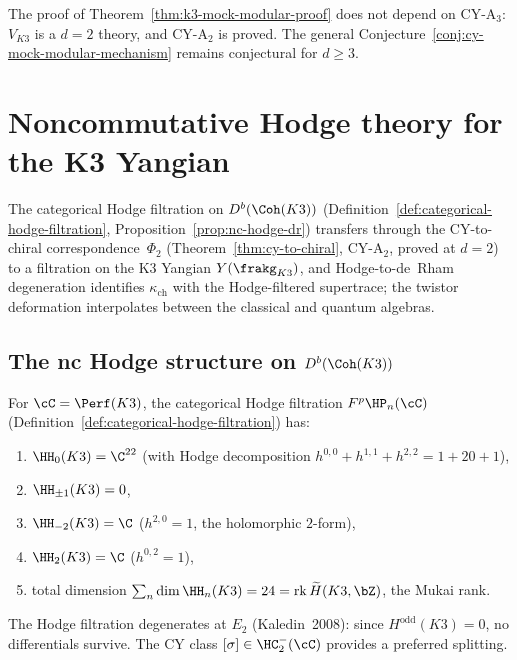 \begin{remark}
\label{rem:k3-mock-dependency}
The proof of Theorem~\ref{thm:k3-mock-modular-proof} does not depend on CY-A$_3$: $V_{K3}$ is a $d = 2$ theory, and CY-A$_2$ is proved. The general Conjecture~\ref{conj:cy-mock-modular-mechanism} remains conjectural for $d \geq 3$.

\smallskip\noindent
\end{remark}



\section{Noncommutative Hodge theory for the K3 Yangian}
\label{sec:nc-hodge-k3-yangian}

The categorical Hodge filtration on $D^b(\Coh(K3))$
(Definition~\ref{def:categorical-hodge-filtration},
Proposition~\ref{prop:nc-hodge-dr})
transfers through the CY-to-chiral correspondence~$\Phi_2$
(Theorem~\ref{thm:cy-to-chiral}, CY-A$_2$, proved at $d=2$) to a
filtration on the K3 Yangian $Y(\frakg_{K3})$, and Hodge-to-de~Rham
degeneration identifies $\kappa_{\mathrm{ch}}$ with the Hodge-filtered
supertrace; the twistor deformation interpolates between the classical
and quantum algebras.

\subsection{The nc Hodge structure on \texorpdfstring{$D^b(\Coh(K3))$}{D-b(Coh(K3))}}
\label{subsec:nc-hodge-k3-cat}

\begin{proposition}
\label{prop:nc-hodge-k3}
For $\cC = \Perf(K3)$, the categorical Hodge filtration
$F^p\HP_n(\cC)$ (Definition~\ref{def:categorical-hodge-filtration})
has:
\begin{enumerate}[label=(\roman*)]
 \item $\HH_0(K3) = \C^{22}$ \textup{(}with Hodge decomposition
 $h^{0,0} + h^{1,1} + h^{2,2} = 1 + 20 + 1$\textup{)},
 \item $\HH_{\pm 1}(K3) = 0$,
 \item $\HH_{-2}(K3) = \C$ \textup{(}$h^{2,0} = 1$, the holomorphic
 $2$-form\textup{)},
 \item $\HH_2(K3) = \C$ \textup{(}$h^{0,2} = 1$\textup{)},
 \item total dimension $\sum_n \dim\HH_n(K3) = 24 = \mathrm{rk}\,
 \widetilde{H}(K3, \bZ)$, the Mukai rank.
\end{enumerate}
The Hodge filtration degenerates at $E_2$
\textup{(}Kaledin~2008\textup{)}: since
$H^{\mathrm{odd}}(K3) = 0$, no differentials survive.
The CY class $[\sigma] \in \HC^-_2(\cC)$ provides a preferred
splitting.
\end{proposition}

